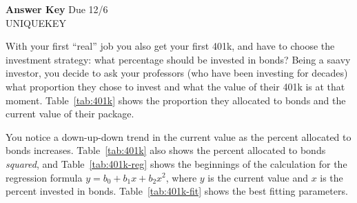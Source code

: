 \documentclass[11pt]{exam}
\begin{document}
 {\ifprintanswers \textbf{Answer Key} \else
  Due 12/6 \fi
  \\ UNIQUEKEY}
\headrule 
\cfoot{\thepage}

\begin{questions}


%
 
  \question With your first ``real'' job you also get your first 401k, and
  have to choose the investment strategy: what percentage should be
  invested in bonds?  Being a saavy investor, you decide to ask your
  professors (who have been investing for decades) what proportion they
  chose to invest and what the value of their 401k is at that moment.
  Table~\ref{tab:401k} shows the proportion they allocated to bonds and the
  current value of their package.

  \question You notice a down-up-down trend in the current value as the
  percent allocated to bonds increases.  Table~\ref{tab:401k} also shows
  the percent allocated to bonds \emph{squared}, and
  Table~\ref{tab:401k-reg} shows the beginnings of the calculation for the
  regression formula $y = b_0 + b_1x + b_2x^2$, where $y$ is the current
  value and $x$ is the percent invested in bonds.  Table~\ref{tab:401k-fit}
  shows the best fitting parameters.
  \begin{parts}

\end{parts}
\end{questions}
\end{document}
